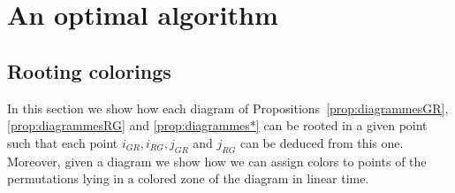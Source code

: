 \documentclass[11pt]{article}
\begin{document}
\section{An optimal algorithm} \label{sec:optimalAlgo}

\subsection{Rooting colorings} \label{ssec:root}

In this section we show how each diagram of Propositions~\ref{prop:diagrammesGR}, \ref{prop:diagrammesRG} and \ref{prop:diagrammes*} can be rooted in a given point such that each point $i_{GR},i_{RG},j_{GR}$ and $j_{RG}$ can be deduced from this one. 
Moreover, given a diagram we show how we can assign colors to points of the permutations lying in a colored zone of the diagram in linear time.
\end{document}
